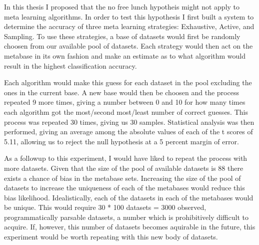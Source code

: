 \documentclass{article}
\begin{document}
In this thesis I proposed that the no free lunch hypotheis might not apply to
meta learning algorithms. In order to test this hypothesis I first built a
system to determine the accuracy of three meta learning strategies:
Exhaustive, Active, and Sampling. To use these strategies, a base of
datasets would first be randomly choosen from our available pool of datasets.
Each strategy would then act on the metabase in its own fashion and make an
estimate as to what algorithm would result in the highest classification
accuracy.

Each algorithm would make this guess for each dataset in the pool excluding the
ones in the current base. A new base would then be choosen and the process
repeated 9 more times, giving a number between 0 and 10 for how many times
each algorithm got the most/second most/least number of correct guesses. This
process was repeated 30 times, giving us 30 samples. Statistical analysis was
then performed, giving an average among the absolute values of each of the t
scores of 5.11, allowing us to reject the null hypothesis at a 5 percent margin
of error.

As a followup to this experiment, I would have liked to repeat the process
with more datasets. Given that the size of the pool of available datasets is 88
there exists a chance of bias in the metabase sets. Increasing the size of the
pool of datasets to increase the uniqueness of each of the metabases would reduce
this bias likelihood. Idealistically, each of the datasets in each of the
metabases would be unique. This would require 30 * 100 datasets = 3000 observed,
programmatically parsable datasets, a number which is prohibitively difficult to
acquire. If, however, this number of datasets becomes aquirable in the future,
this experiment would be worth repeating with this new body of datasets.
\end{document}
